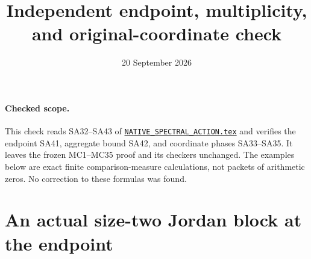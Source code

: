 \documentclass[11pt]{article}
\title{Independent endpoint, multiplicity, and original-coordinate check}
\author{}
\date{20 September 2026}
\begin{document}
\maketitle

\paragraph{Checked scope.}
This check reads SA32--SA43 of
\href{https://github.com/KokunoYumeto/zeta-function-research-reader/blob/5992ad50c0f2a06921f1fcaded7b4e38097c0739/workbenches/splitzero-tandem/continuations/20260920-original-kernel-mixed-determinants/providers/NATIVE_SPECTRAL_ACTION.tex\#L1}{\texttt{NATIVE\_SPECTRAL\_ACTION.tex}} and verifies the endpoint
SA41, aggregate bound SA42, and coordinate phases SA33--SA35.
It leaves the frozen MC1--MC35 proof and its checkers unchanged.
The examples below are exact finite comparison-measure calculations,
not packets of arithmetic zeros. No correction to these formulas was found.

\section{An actual size-two Jordan block at the endpoint}
\end{document}
